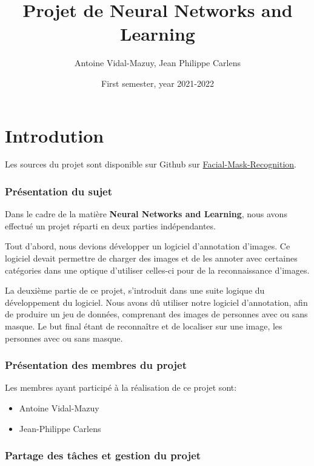 \documentclass{rapport}
\title{Projet de Neural Networks and Learning}
\author{Antoine Vidal-Mazuy, Jean Philippe Carlens}
\date{First semester, year 2021-2022}
\begin{document}
\maketitle
\tableofcontents


\clearpage
\part{Introdution}

    Les sources du projet sont disponible sur Github sur \href{https://github.com/Brotherta/Facial-Mask-Recognition}{Facial-Mask-Recognition}.
    
    \section{Présentation du sujet}
    
        Dans le cadre de la matière \textbf{Neural Networks and Learning}, nous avons effectué un projet réparti en deux parties indépendantes. 

        Tout d'abord, nous devions développer un logiciel d'annotation d'images. Ce logiciel devait permettre de charger des images et de les annoter avec certaines catégories dans une optique d'utiliser celles-ci pour de la reconnaissance d'images.

        La deuxième partie de ce projet, s'introduit dans une suite logique du développement du logiciel. Nous avons dû utiliser notre logiciel d'annotation, afin de produire un jeu de données, comprenant des images de personnes avec ou sans masque. Le but final étant de reconnaître et de localiser sur une image, les personnes avec ou sans masque.
    
    \section{Présentation des membres du projet}
    
        Les membres ayant participé à la réalisation de ce projet sont:
        
        \begin{itemize}
            \item Antoine Vidal-Mazuy
            \item Jean-Philippe Carlens
        \end{itemize}
    
    \section{Partage des tâches et gestion du projet}
    
\end{document}
